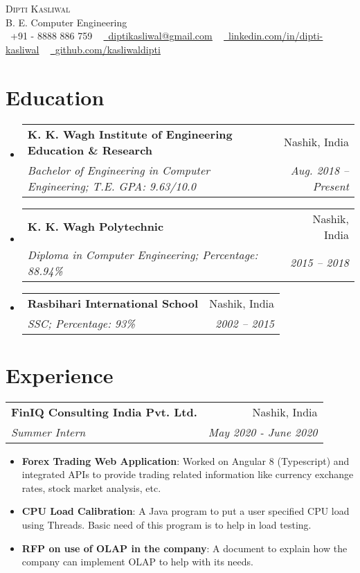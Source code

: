\documentclass[a4,11pt]{article}
\makeatletter
\newcommand{\resumeItem}[2]{
  \item\small{
    \textbf{#1}{: #2 \vspace{-2pt}}
  }
}
\newcommand{\resumeCompany}[4]{
    \begin{tabular*}{0.99\textwidth}[t]{l@{\extracolsep{\fill}}r}
      \textbf{#1} & #2 \\
      \textit{\small#3} & \textit{\small #4} \\
    \end{tabular*}\vspace{-5pt}
}
\newcommand{\resumeSubheading}[4]{
  \vspace{-1pt}\item
    \begin{tabular*}{0.97\textwidth}[t]{l@{\extracolsep{\fill}}r}
      \textbf{#1} & #2 \\
      \textit{\small#3} & \textit{\small #4} \\
    \end{tabular*}\vspace{-5pt}
}
\newcommand{\resumeSubHeadingListStart}{\begin{itemize}[leftmargin=*]}
\newcommand{\resumeSubHeadingListEnd}{\end{itemize}}
\newcommand{\resumeItemListStart}{\begin{itemize}}
\newcommand{\resumeItemListEnd}{\end{itemize}\vspace{-5pt}}
\makeatother
\begin{document}
	\begin{center}
		{\Huge \scshape Dipti Kasliwal} \\ \vspace{1pt}
		B. E. Computer Engineering \\ \vspace{1pt}
		\small \raisebox{-0.1\height}\faPhone\ +91 - 8888 886 759 ~ \href{mailto:diptikasliwal@gmail.com}{\raisebox{-0.2\height}\faEnvelope\  \underline{diptikasliwal@gmail.com}} ~ 
		\href{https://www.linkedin.com/in/dipti-kasliwal}{\raisebox{-0.2\height}\faLinkedin\ \underline{linkedin.com/in/dipti-kasliwal}}  ~
		\href{https://github.com/kasliwaldipti}{\raisebox{-0.2\height}\faGithub\ \underline{github.com/kasliwaldipti}}
		\vspace{-8pt}
	\end{center}





\section {Education}
	\resumeSubHeadingListStart
	  \resumeSubheading
		{K. K. Wagh Institute of Engineering Education \& Research}{Nashik, India}
		{Bachelor of Engineering in Computer Engineering; T.E. GPA: 9.63/10.0}{Aug. 2018 -- Present}
	  \resumeSubheading
		{K. K. Wagh Polytechnic}{Nashik, India}
		{Diploma in Computer Engineering; Percentage: 88.94\%}{2015 -- 2018}
	  \resumeSubheading
	    {Rasbihari International School}{Nashik, India}
		{SSC; Percentage: 93\%}{2002 -- 2015}
	\resumeSubHeadingListEnd


\section{Experience}
	\resumeCompany
      {FinIQ Consulting India Pvt. Ltd.}{Nashik, India}
      {Summer Intern}{May 2020 - June 2020}
			\resumeItemListStart
				\resumeItem{Forex Trading Web Application}{Worked on Angular 8 (Typescript) and integrated APIs to provide trading related information like currency exchange rates, stock market analysis, etc.}
				\resumeItem{CPU Load Calibration}{A Java program to put a user specified CPU load using Threads. Basic need of this program is to help in load testing.}
				\resumeItem{RFP on use of OLAP in the company}{A document to explain how the company can implement OLAP to help with its needs.}
			\resumeItemListEnd
		
\end{document}
